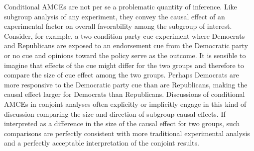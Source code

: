\documentclass[a4paper,12pt]{article}\usepackage[]{graphicx}\usepackage[]{color}
\begin{document}
Conditional AMCEs are not per se a problematic quantity of inference. Like subgroup analysis of any experiment, they convey the causal effect of an experimental factor on overall favorability among the subgroup of interest. Consider, for example, a two-condition party cue experiment where Democrats and Republicans are exposed to an endorsement cue from the Democratic party or no cue and opinions toward the policy serve as the outcome. It is sensible to imagine that effects of the cue might differ for the two groups and therefore to compare the size of cue effect among the two groups. Perhaps Democrats are more responsive to the Democratic party cue than are Republicans, making the causal effect larger for Democrats than Republicans. Discussions of conditional AMCEs in conjoint analyses often explicitly or implicitly engage in this kind of discussion comparing the size and direction of subgroup causal effects. If interpreted as a difference in the size of the causal effect for two groups, such comparisons are perfectly consistent with more traditional experimental analysis and a perfectly acceptable interpretation of the conjoint results.
\end{document}
